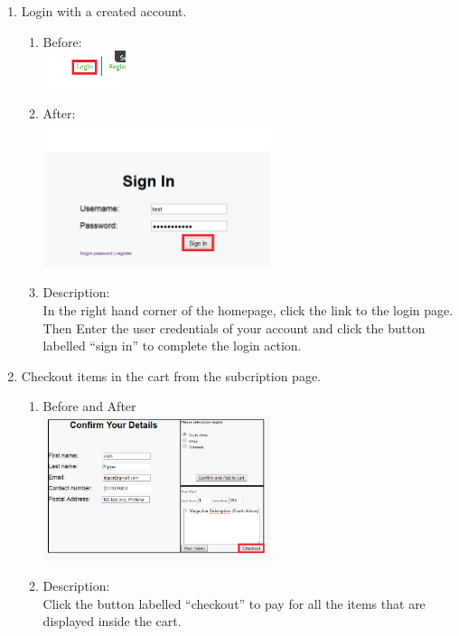 \documentclass[11pt]{article}
\begin{document}
\begin{enumerate}
		\item Login with a created account.
			\begin{enumerate}
				\item Before: \\
					\includegraphics[width=0.2\textwidth]{../Images/Tasks/login_act2.png}
				\item After: \\
					\includegraphics[width=0.55\textwidth]{../Images/Tasks/login_act.png}
					\item Description: \\In the right hand corner of the homepage, click the link to the login page. Then Enter the user credentials of your account and click the button labelled “sign in” to complete the login action.
			\end{enumerate}
		
		\item Checkout items in the cart from the subcription page.
			\begin{enumerate}
				\item Before and After \\
					\includegraphics[width=0.55\textwidth]{../Images/Tasks/checkout.png}
					\item Description: \\Click the button labelled “checkout” to pay for all the items that are displayed inside the cart. \newpage
			\end{enumerate}


\end{enumerate}
\end{document}
